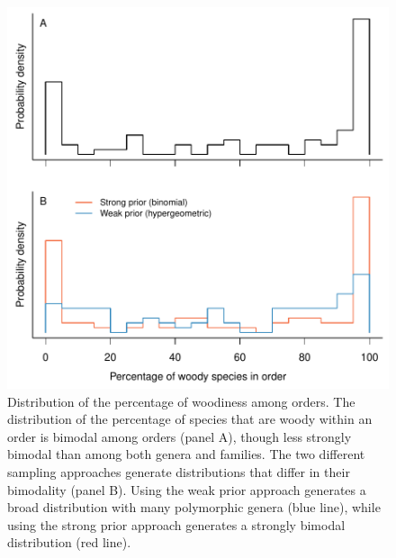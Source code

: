 \begin{figure}[p]
  \centering
  \includegraphics[width=\textwidth]{figs/fraction-by-order}
  \caption[Distribution of woodiness proportion among
  orders]{Distribution of the percentage of woodiness among orders.
    The distribution of the percentage of species that are woody within
    an order is bimodal among orders (panel A), though
    less strongly bimodal than among both genera and families.
    The two different sampling approaches generate distributions that
    differ in their bimodality (panel B).  Using the weak prior
    approach generates a broad distribution with many polymorphic
    genera (blue line), while using the strong prior approach
    generates a strongly bimodal distribution (red line).}
  \label{fig:distribution-order}
\end{figure}



